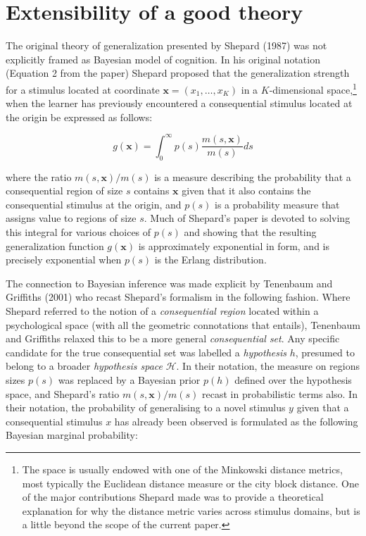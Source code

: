 \documentclass[english,doc]{apa6}
\begin{document}
\hypertarget{extensibility-of-a-good-theory}{%
\section{Extensibility of a good theory}\label{extensibility-of-a-good-theory}}

The original theory of generalization presented by Shepard (1987) was not explicitly framed as Bayesian model of cognition. In his original notation (Equation 2 from the paper) Shepard proposed that the generalization strength for a stimulus located at coordinate \(\mathbf{x} = (x_1, \ldots, x_K)\) in a \(K\)-dimensional space,\footnote{The space is usually endowed with one of the Minkowski distance metrics, most typically the Euclidean distance measure or the city block distance. One of the major contributions Shepard made was to provide a theoretical explanation for why the distance metric varies across stimulus domains, but is a little beyond the scope of the current paper.} when the learner has previously encountered a consequential stimulus located at the origin be expressed as follows:

\begin{equation}
g(\mathbf{x}) = \int_0^\infty p(s) \frac{m(s, \mathbf{x})}{m(s)} ds
\end{equation}

\noindent
where the ratio \(m(s, \mathbf{x})/m(s)\) is a measure describing the probability that a consequential region of size \(s\) contains \(\mathbf{x}\) given that it also contains the consequential stimulus at the origin, and \(p(s)\) is a probability measure that assigns value to regions of size \(s\). Much of Shepard's paper is devoted to solving this integral for various choices of \(p(s)\) and showing that the resulting generalization function \(g(\mathbf{x})\) is approximately exponential in form, and is precisely exponential when \(p(s)\) is the Erlang distribution.

The connection to Bayesian inference was made explicit by Tenenbaum and Griffiths (2001) who recast Shepard's formalism in the following fashion. Where Shepard referred to the notion of a \emph{consequential region} located within a psychological space (with all the geometric connotations that entails), Tenenbaum and Griffiths relaxed this to be a more general \emph{consequential set}. Any specific candidate for the true consequential set was labelled a \emph{hypothesis} \(h\), presumed to belong to a broader \emph{hypothesis space} \(\mathcal{H}\). In their notation, the measure on regions sizes \(p(s)\) was replaced by a Bayesian prior \(p(h)\) defined over the hypothesis space, and Shepard's ratio \(m(s, \mathbf{x})/m(s)\) recast in probabilistic terms also. In their notation, the probability of generalising to a novel stimulus \(y\) given that a consequential stimulus \(x\) has already been observed is formulated as the following Bayesian marginal probability:
\end{document}
